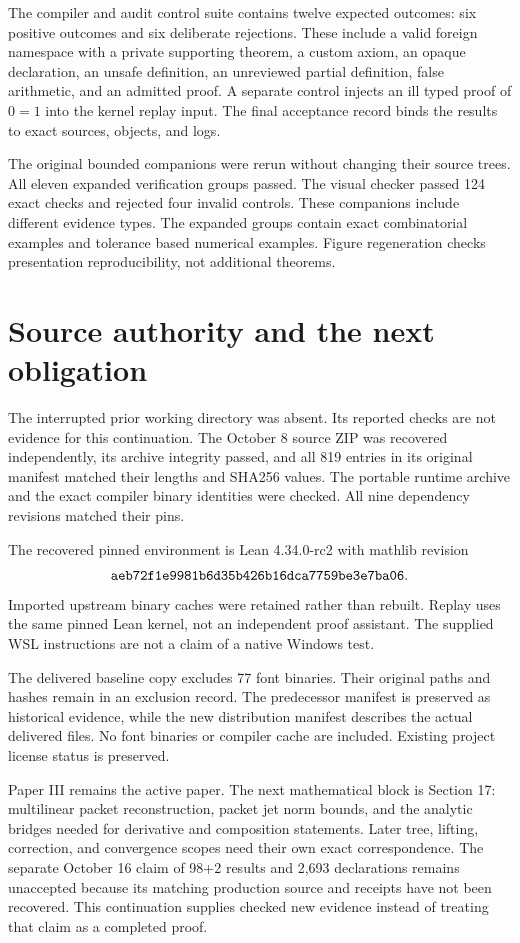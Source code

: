 \documentclass[11pt]{article}
\begin{document}
The compiler and audit control suite contains twelve expected outcomes: six positive outcomes and six deliberate rejections. These include a valid foreign namespace with a private supporting theorem, a custom axiom, an opaque declaration, an unsafe definition, an unreviewed partial definition, false arithmetic, and an admitted proof. A separate control injects an ill typed proof of $0=1$ into the kernel replay input. The final acceptance record binds the results to exact sources, objects, and logs.

The original bounded companions were rerun without changing their source trees. All eleven expanded verification groups passed. The visual checker passed 124 exact checks and rejected four invalid controls. These companions include different evidence types. The expanded groups contain exact combinatorial examples and tolerance based numerical examples. Figure regeneration checks presentation reproducibility, not additional theorems.

\section{Source authority and the next obligation}
The interrupted prior working directory was absent. Its reported checks are not evidence for this continuation. The October 8 source ZIP was recovered independently, its archive integrity passed, and all 819 entries in its original manifest matched their lengths and SHA256 values. The portable runtime archive and the exact compiler binary identities were checked. All nine dependency revisions matched their pins.

The recovered pinned environment is Lean 4.34.0-rc2 with mathlib revision
\[\text{\ttfamily aeb72f1e9981b6d35b426b16dca7759be3e7ba06}.\]
Imported upstream binary caches were retained rather than rebuilt. Replay uses the same pinned Lean kernel, not an independent proof assistant. The supplied WSL instructions are not a claim of a native Windows test.

The delivered baseline copy excludes 77 font binaries. Their original paths and hashes remain in an exclusion record. The predecessor manifest is preserved as historical evidence, while the new distribution manifest describes the actual delivered files. No font binaries or compiler cache are included. Existing project license status is preserved.

Paper III remains the active paper. The next mathematical block is Section 17: multilinear packet reconstruction, packet jet norm bounds, and the analytic bridges needed for derivative and composition statements. Later tree, lifting, correction, and convergence scopes need their own exact correspondence. The separate October 16 claim of 98+2 results and 2,693 declarations remains unaccepted because its matching production source and receipts have not been recovered. This continuation supplies checked new evidence instead of treating that claim as a completed proof.
\end{document}
